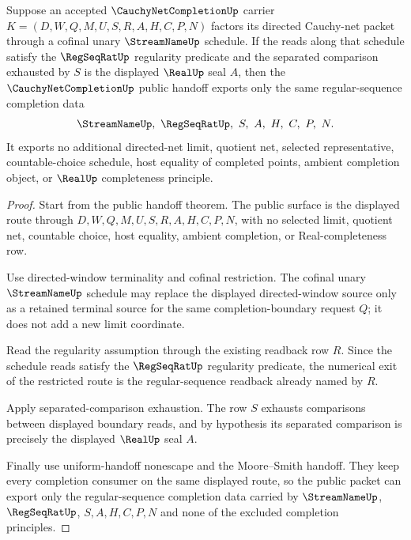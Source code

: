 \begin{theorem}
\label{thm:cauchy-net-completion-regular-sequence-public-bridge}
Suppose an accepted $\CauchyNetCompletionUp$ carrier $K=(D,W,Q,M,U,S,R,A,H,C,P,N)$ factors its directed Cauchy-net packet through a cofinal unary $\StreamNameUp$ schedule. If the reads along that schedule satisfy the $\RegSeqRatUp$ regularity predicate and the separated comparison exhausted by $S$ is the displayed $\RealUp$ seal $A$, then the $\CauchyNetCompletionUp$ public handoff exports only the same regular-sequence completion data
$$
\StreamNameUp,\ \RegSeqRatUp,\ S,\ A,\ H,\ C,\ P,\ N .
$$
It exports no additional directed-net limit, quotient net, selected representative, countable-choice schedule, host equality of completed points, ambient completion object, or $\RealUp$ completeness principle.
\end{theorem}
\begin{proof}
Start from the public handoff theorem. The public surface is the displayed route through $D,W,Q,M,U,S,R,A,H,C,P,N$, with no selected limit, quotient net, countable choice, host equality, ambient completion, or Real-completeness row.

Use directed-window terminality and cofinal restriction. The cofinal unary $\StreamNameUp$ schedule may replace the displayed directed-window source only as a retained terminal source for the same completion-boundary request $Q$; it does not add a new limit coordinate.

Read the regularity assumption through the existing readback row $R$. Since the schedule reads satisfy the $\RegSeqRatUp$ regularity predicate, the numerical exit of the restricted route is the regular-sequence readback already named by $R$.

Apply separated-comparison exhaustion. The row $S$ exhausts comparisons between displayed boundary reads, and by hypothesis its separated comparison is precisely the displayed $\RealUp$ seal $A$.

Finally use uniform-handoff nonescape and the Moore--Smith handoff. They keep every completion consumer on the same displayed route, so the public packet can export only the regular-sequence completion data carried by $\StreamNameUp$, $\RegSeqRatUp$, $S,A,H,C,P,N$ and none of the excluded completion principles.
\end{proof}


